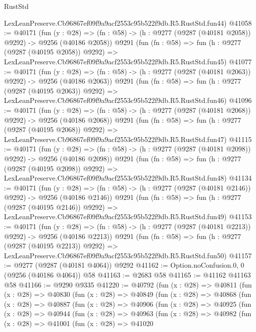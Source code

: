\begin{lexlean}{RustStd}
\begin{coremodule}
    LexLeanPreserve.Cb96867ef09f9a9acf2553c95b522f9db.R5.RustStd.fun44)
@41058 := @40171
    (fun (y : @28) =>
    (fn : @58) -> (h : @9277 (@9287 (@40181 @2058)) @9292) -> @9256 (@40186 @2058))
    @9291
    (fun (fn : @58) =>
    fun (h : @9277 (@9287 (@40195 @2058)) @9292) =>
    LexLeanPreserve.Cb96867ef09f9a9acf2553c95b522f9db.R5.RustStd.fun45)
@41077 := @40171
    (fun (y : @28) =>
    (fn : @58) -> (h : @9277 (@9287 (@40181 @2063)) @9292) -> @9256 (@40186 @2063))
    @9291
    (fun (fn : @58) =>
    fun (h : @9277 (@9287 (@40195 @2063)) @9292) =>
    LexLeanPreserve.Cb96867ef09f9a9acf2553c95b522f9db.R5.RustStd.fun46)
@41096 := @40171
    (fun (y : @28) =>
    (fn : @58) -> (h : @9277 (@9287 (@40181 @2068)) @9292) -> @9256 (@40186 @2068))
    @9291
    (fun (fn : @58) =>
    fun (h : @9277 (@9287 (@40195 @2068)) @9292) =>
    LexLeanPreserve.Cb96867ef09f9a9acf2553c95b522f9db.R5.RustStd.fun47)
@41115 := @40171
    (fun (y : @28) =>
    (fn : @58) -> (h : @9277 (@9287 (@40181 @2098)) @9292) -> @9256 (@40186 @2098))
    @9291
    (fun (fn : @58) =>
    fun (h : @9277 (@9287 (@40195 @2098)) @9292) =>
    LexLeanPreserve.Cb96867ef09f9a9acf2553c95b522f9db.R5.RustStd.fun48)
@41134 := @40171
    (fun (y : @28) =>
    (fn : @58) -> (h : @9277 (@9287 (@40181 @2146)) @9292) -> @9256 (@40186 @2146))
    @9291
    (fun (fn : @58) =>
    fun (h : @9277 (@9287 (@40195 @2146)) @9292) =>
    LexLeanPreserve.Cb96867ef09f9a9acf2553c95b522f9db.R5.RustStd.fun49)
@41153 := @40171
    (fun (y : @28) =>
    (fn : @58) -> (h : @9277 (@9287 (@40181 @2213)) @9292) -> @9256 (@40186 @2213))
    @9291
    (fun (fn : @58) =>
    fun (h : @9277 (@9287 (@40195 @2213)) @9292) =>
    LexLeanPreserve.Cb96867ef09f9a9acf2553c95b522f9db.R5.RustStd.fun50)
@41157 := @9277 (@9287 (@40181 @4064)) @9292
@41162 := Option.noConfusion.{0, 0} (@9256 (@40186 @4064)) @58
@41163 := @2683 @58
@41165 := @41162 @41163 @58
@41166 := @9290 @9335
@41220 := @40792
    (fun (x : @28) =>
    @40811
      (fun (x : @28) =>
      @40830
        (fun (x : @28) =>
        @40849
          (fun (x : @28) =>
          @40868
            (fun (x : @28) =>
            @40887
              (fun (x : @28) =>
              @40906
                (fun (x : @28) =>
                @40925
                  (fun (x : @28) =>
                  @40944
                    (fun (x : @28) =>
                    @40963
                      (fun (x : @28) =>
                      @40982
                        (fun (x : @28) =>
                        @41001
                          (fun (x : @28) =>
                          @41020

\end{coremodule}
\end{lexlean}
